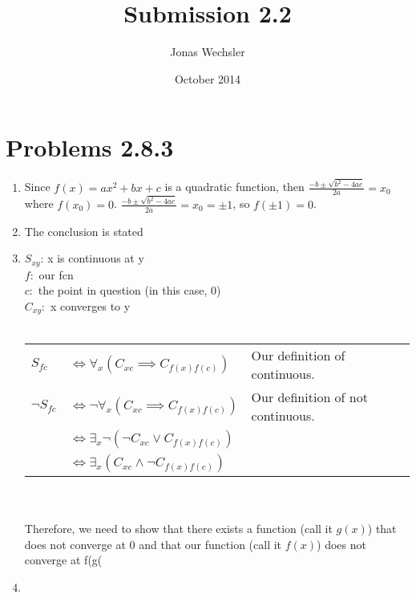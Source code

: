 \documentclass{article}
\title{Submission 2.2}
\author{Jonas Wechsler}
\date{October 2014}
\begin{document}
	\maketitle
	\section{Problems 2.8.3}
	\begin{enumerate}
		\item
			Since $f(x) = ax^2 + bx + c$ is a quadratic function, then $\frac{-b \pm \sqrt{b^2-4ac}}{2a} = x_0$ where $f(x_0) = 0$. $\frac{-b \pm \sqrt{b^2-4ac}}{2a} = x_0 = \pm 1$, so $f(\pm 1) = 0$.
		\item
			The conclusion is stated  
		\item
			$S_{xy}$: x is continuous at y\\
			$f:$ our fcn\\
			$c:$ the point in question (in this case, 0)\\
			$C_{xy}:$ x converges to y\\
			\\
			\begin{tabular}{l l l}
				$S_{fc}$ & $\iff \forall _x (C_{xc} \implies C_{f(x)f(c)})$ & Our definition of continuous.\\
				$\lnot S_{fc}$ & $\iff \lnot \forall _x (C_{xc} \implies C_{f(x)f(c)})$ & Our definition of not continuous.\\
				& $\iff \exists _x \lnot(\lnot C_{xc} \lor C_{f(x)f(c)})$\\
				& $\iff \exists _x (C_{xc} \land \lnot C_{f(x)f(c)})$\\
			\end{tabular}\\
			\\
			Therefore, we need to show that there exists a function (call it $g(x)$) that does not converge at 0 and that our function (call it $f(x)$) does not converge at f(g(
		\item
	\end{enumerate}
\end{document}
